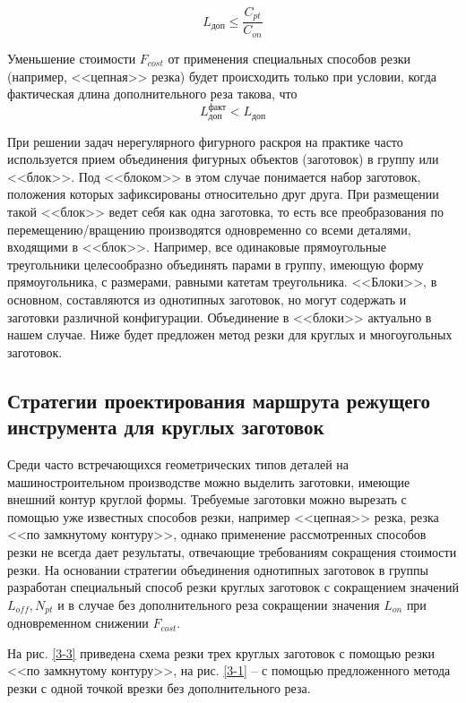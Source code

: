 \documentclass[11pt,twoside]{report}
\begin{document}
\begin{equation}
  L_\text{доп} \leqslant \frac{C_{pt}}{C_{on}}
  \label{l-dop}
\end{equation}

Уменьшение стоимости
$F_{cost}$
от применения специальных способов резки
(например, <<цепная>> резка)
будет происходить только при условии,
когда фактическая длина дополнительного реза
такова, что
\begin{equation}
  L_\text{доп}^\text{факт} < L_\text{доп}
  \label{l-fact-dop}
\end{equation}

При решении задач нерегулярного фигурного раскроя
на практике часто используется прием объединения
фигурных объектов (заготовок)
в группу или <<блок>>.
Под <<блоком>> в этом случае понимается набор заготовок,
положения которых зафиксированы относительно друг друга.
При размещении такой <<блок>> ведет себя как одна заготовка,
то есть все преобразования по перемещению/вращению производятся
одновременно со всеми деталями, входящими в <<блок>>.
Например, все одинаковые прямоугольные треугольники
целесообразно объединять парами в группу, имеющую форму прямоугольника,
с размерами, равными катетам треугольника.
<<Блоки>>, в основном, составляются из однотипных заготовок,
но могут содержать и заготовки различной конфигурации.
Объединение в <<блоки>> актуально в нашем случае.
Ниже будет предложен метод резки для круглых и многоугольных заготовок.

\subsection{Стратегии проектирования маршрута режущего инструмента для круглых заготовок}

Среди часто встречающихся геометрических типов деталей
на машиностроительном производстве можно выделить заготовки,
имеющие внешний контур круглой формы.
Требуемые заготовки можно вырезать с
помощью уже известных способов резки,
например <<цепная>> резка, резка <<по замкнутому контуру>>,
однако применение рассмотренных способов резки не всегда
дает результаты, отвечающие требованиям сокращения стоимости резки.
На основании стратегии объединения однотипных заготовок
в группы разработан специальный способ резки круглых
заготовок с сокращением значений
$L_{off}, N_{pt}$
и в случае без дополнительного реза сокращении значения
$L_{on}$
при одновременном снижении
$F_{cost}$.

На рис. \ref{3-3}
приведена схема резки трех круглых заготовок
с помощью резки <<по замкнутому контуру>>,
на рис. \ref{3-1}
– с помощью предложенного метода резки
с одной точкой врезки без дополнительного реза.
\end{document}
